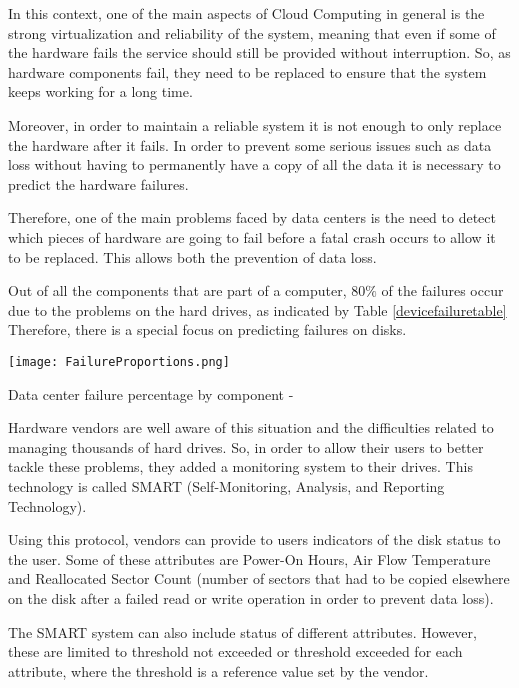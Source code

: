 In this context, one of the main aspects of Cloud Computing in general is the strong virtualization and reliability of the system\cite{Qian09}, meaning that even if some of the hardware fails the service should still be provided without interruption.
So, as hardware components fail, they need to be replaced to ensure that the system keeps working for a long time.

Moreover, in order to maintain a reliable system it is not enough to only replace the hardware after it fails.
In order to prevent some serious issues such as data loss without having to permanently have a copy of all the data it is necessary to predict the hardware failures.

Therefore, one of the main problems faced by data centers is the need to detect which pieces of hardware are going to fail before a fatal crash occurs to allow it to be replaced.
This allows both the prevention of data loss.

Out of all the components that are part of a computer, $80\%$ of the failures occur due to the problems on the hard drives, as indicated by Table \ref{devicefailuretable}
Therefore, there is a special focus on predicting failures on disks.

\begin{table}
    \begin{center}
      \texttt{[image: FailureProportions.png]}
      \caption[Failure percentage by component]{Data center failure percentage by component - \cite{Wang17}}
      \label{devicefailuretable}
    \end{center}
  \end{table}

Hardware vendors are well aware of this situation and the difficulties related to managing thousands of hard drives.
So, in order to allow their users to better tackle these problems, they added a monitoring system to their drives.
This technology is called SMART (Self-Monitoring, Analysis, and Reporting Technology).

Using this protocol, vendors can provide to users indicators of the disk status to the user.
Some of these attributes are Power-On Hours, Air Flow Temperature and Reallocated Sector Count (number of sectors that had to be copied elsewhere on the disk after a failed read or write operation in order to prevent data loss)\cite{SamsungSSD}.

The SMART system can also include status of different attributes.
However, these are limited to threshold not exceeded or threshold exceeded for each attribute, where the threshold is a reference value set by the vendor\cite{SamsungSSD}.

